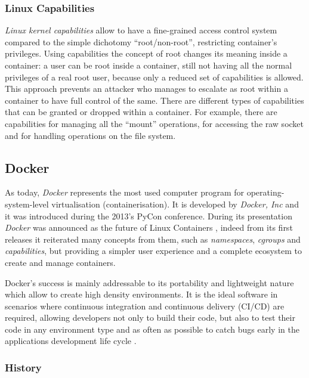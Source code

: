 \documentclass[a4paper,12pt]{article}
\begin{document}
\subsubsection{Linux Capabilities}

\textit{Linux kernel capabilities} \cite{man_capabilities} allow to have a
fine-grained access control system compared to the simple dichotomy
``root/non-root'', restricting container's privileges. Using capabilities the
concept of root changes its meaning inside a container: a user can be root
inside a container, still not having all the normal privileges of a real root
user, because only a reduced set of capabilities is allowed. This approach
prevents an attacker who manages to escalate as root within a container to have
full control of the same. There are different types of capabilities that can be
granted or dropped within a container. For example, there are capabilities for
managing all the ``mount'' operations, for accessing the raw socket and for
handling operations on the file system.

\subsection{Docker}

As today, \textit{Docker} represents the most used computer program for
operating-system-level virtualisation (containerisation). It is developed by
\textit{Docker, Inc} \cite{docker_official_site} and it was introduced during
the 2013's PyCon conference. During its presentation \textit{Docker} was
announced as the future of Linux Containers \cite{docker_pycon_presentation},
indeed from its first releases it reiterated many concepts from them, such as
\textit{namespaces}, \textit{cgroups} and \textit{capabilities}, but providing a
simpler user experience and a complete ecosystem to create and manage
containers.\par Docker's success is mainly addressable to its portability and
lightweight nature which allow to create high density environments. It is the
ideal software in scenarios where continuous integration and continuous delivery
(CI/CD) are required, allowing developers not only to build their code, but also
to test their code in any environment type and as often as possible to catch
bugs early in the applications development life cycle \cite{docker_ci_cd}. 

\subsubsection{History}
\end{document}

